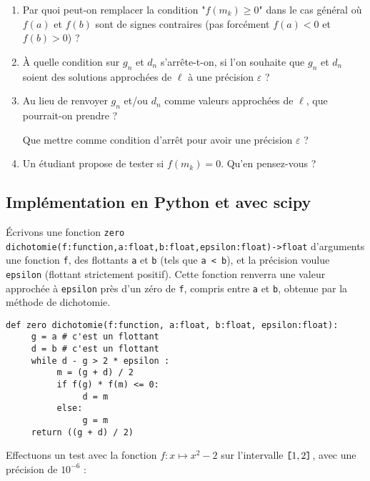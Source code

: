  \begin{enumerate}
 \item Par quoi peut-on remplacer la condition "$f(m_k)\geq 0$" dans le cas général où $f(a)$ et $f(b)$ sont de signes contraires (pas forcément $f(a)<0$ et $f(b)>0$) ?

 \item \`A quelle condition sur $g_n$ et $d_n$ s'arrête-t-on, si l'on souhaite que $g_n$ et $d_n$ soient des solutions approchées de $\ell$ à une précision $\varepsilon$ ?

 \item  Au lieu de renvoyer $g_n$ et/ou $d_n$ comme valeurs approchées de $\ell$, que pourrait-on prendre ? 
 
 Que mettre comme condition d'arrêt pour avoir une précision $\varepsilon$  ? 

 \item Un étudiant propose de tester si $f(m_k)=0$.  Qu'en pensez-vous ?

\end{enumerate}


\subsection{Implémentation en Python et avec scipy}
\'Ecrivons une fonction \lstinline{zero dichotomie(f:function,a:float,b:float,epsilon:float)->float} d'arguments une fonction \lstinline{f}, des flottants \lstinline{a} et \lstinline{b} (tels que \lstinline{a < b}), et  la précision voulue \lstinline{epsilon} (flottant strictement positif). Cette fonction renverra une valeur approchée à \lstinline{epsilon} près d'un zéro de \lstinline{f}, compris entre \lstinline{a} et \lstinline{b}, obtenue par la méthode de dichotomie.

\begin{lstlisting}
def zero dichotomie(f:function, a:float, b:float, epsilon:float):
     g = a # c'est un flottant
     d = b # c'est un flottant
     while d - g > 2 * epsilon :
          m = (g + d) / 2
          if f(g) * f(m) <= 0:
               d = m
          else:
               g = m
     return ((g + d) / 2)
\end{lstlisting}

Effectuons un test avec la fonction $f : x \mapsto x^2-2$ sur l'intervalle $\verb![!1,2\verb!]!$, avec une précision de $10^{-6}$ :
 
